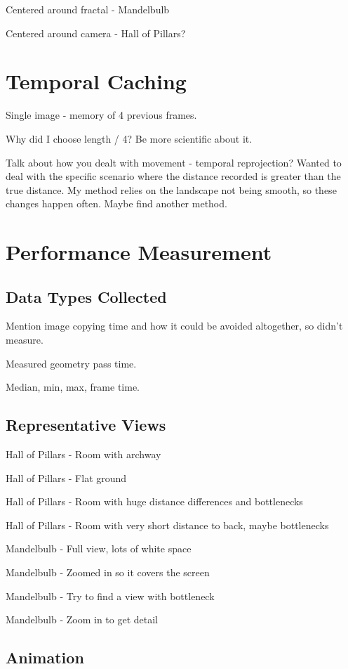 Centered around fractal - Mandelbulb

Centered around camera - Hall of Pillars?

\section{Temporal Caching}

Single image - memory of 4 previous frames.

Why did I choose length / 4? Be more scientific about it.

Talk about how you dealt with movement - temporal reprojection? Wanted to deal with the specific scenario where the distance recorded is greater than the true distance. My method relies on the landscape not being smooth, so these changes happen often. Maybe find another method.

\section{Performance Measurement}

\subsection{Data Types Collected}

Mention image copying time and how it could be avoided altogether, so didn't measure.

Measured geometry pass time.

Median, min, max, frame time.

\subsection{Representative Views}

Hall of Pillars - Room with archway

Hall of Pillars - Flat ground

Hall of Pillars - Room with huge distance differences and bottlenecks

Hall of Pillars - Room with very short distance to back, maybe bottlenecks

Mandelbulb - Full view, lots of white space

Mandelbulb - Zoomed in so it covers the screen

Mandelbulb - Try to find a view with bottleneck

Mandelbulb - Zoom in to get detail

\subsection{Animation}

